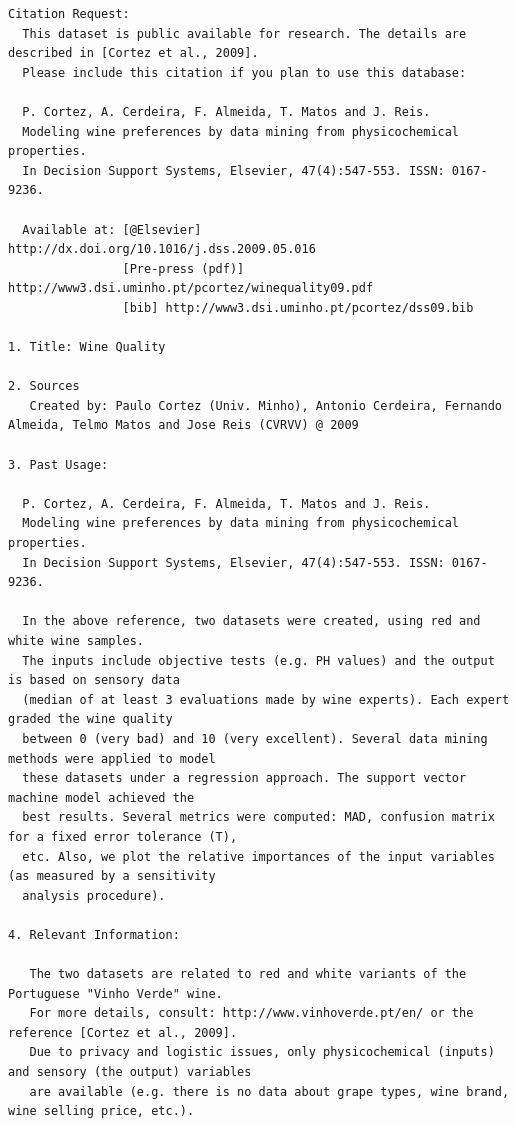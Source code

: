 \documentclass[11pt]{article}
\begin{document}
    \begin{Verbatim}[commandchars=\\\{\}]
Citation Request:
  This dataset is public available for research. The details are described in [Cortez et al., 2009]. 
  Please include this citation if you plan to use this database:

  P. Cortez, A. Cerdeira, F. Almeida, T. Matos and J. Reis. 
  Modeling wine preferences by data mining from physicochemical properties.
  In Decision Support Systems, Elsevier, 47(4):547-553. ISSN: 0167-9236.

  Available at: [@Elsevier] http://dx.doi.org/10.1016/j.dss.2009.05.016
                [Pre-press (pdf)] http://www3.dsi.uminho.pt/pcortez/winequality09.pdf
                [bib] http://www3.dsi.uminho.pt/pcortez/dss09.bib

1. Title: Wine Quality 

2. Sources
   Created by: Paulo Cortez (Univ. Minho), Antonio Cerdeira, Fernando Almeida, Telmo Matos and Jose Reis (CVRVV) @ 2009
   
3. Past Usage:

  P. Cortez, A. Cerdeira, F. Almeida, T. Matos and J. Reis. 
  Modeling wine preferences by data mining from physicochemical properties.
  In Decision Support Systems, Elsevier, 47(4):547-553. ISSN: 0167-9236.

  In the above reference, two datasets were created, using red and white wine samples.
  The inputs include objective tests (e.g. PH values) and the output is based on sensory data
  (median of at least 3 evaluations made by wine experts). Each expert graded the wine quality 
  between 0 (very bad) and 10 (very excellent). Several data mining methods were applied to model
  these datasets under a regression approach. The support vector machine model achieved the
  best results. Several metrics were computed: MAD, confusion matrix for a fixed error tolerance (T),
  etc. Also, we plot the relative importances of the input variables (as measured by a sensitivity
  analysis procedure).
 
4. Relevant Information:

   The two datasets are related to red and white variants of the Portuguese "Vinho Verde" wine.
   For more details, consult: http://www.vinhoverde.pt/en/ or the reference [Cortez et al., 2009].
   Due to privacy and logistic issues, only physicochemical (inputs) and sensory (the output) variables 
   are available (e.g. there is no data about grape types, wine brand, wine selling price, etc.).


\end{Verbatim}
\end{document}
